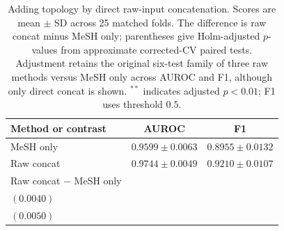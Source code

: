 \begin{table}[t]
\centering
\caption{Adding topology by direct raw-input concatenation. Scores are mean $\pm$ SD across 25 matched folds. The difference is raw concat minus MeSH only; parentheses give Holm-adjusted $p$-values from approximate corrected-CV paired tests. Adjustment retains the original six-test family of three raw methods versus MeSH only across AUROC and F1, although only direct concat is shown. $^{**}$ indicates adjusted $p<0.01$; F1 uses threshold $0.5$.}
\label{tab:raw-concat-topology}
\footnotesize
\setlength{\tabcolsep}{3pt}
\begin{tabular}{@{}lcc@{}}
\toprule
Method or contrast & AUROC & F1 \\
\midrule
MeSH only & $0.9599\pm0.0063$ & $0.8955\pm0.0132$ \\
Raw concat & $0.9744\pm0.0049$ & $0.9210\pm0.0107$ \\
\midrule
Raw concat $-$ MeSH only & \shortstack{$+0.01458^{**}$\\{\scriptsize $(0.0040)$}} & \shortstack{$+0.02543^{**}$\\{\scriptsize $(0.0050)$}} \\
\bottomrule
\end{tabular}
\end{table}
